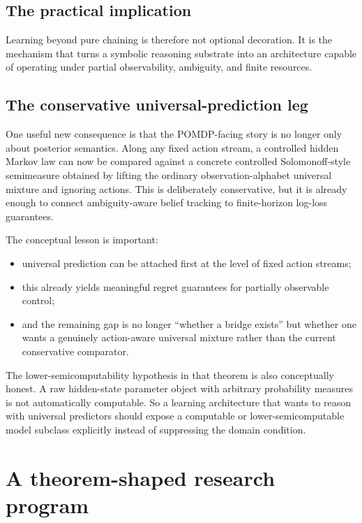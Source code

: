 \documentclass[11pt]{article}
\begin{document}
\subsection{The practical implication}

Learning beyond pure chaining is therefore not optional decoration.  It is the
mechanism that turns a symbolic reasoning substrate into an architecture capable
of operating under partial observability, ambiguity, and finite resources.

\subsection{The conservative universal-prediction leg}

One useful new consequence is that the POMDP-facing story is no longer only
about posterior semantics.  Along any fixed action stream, a controlled hidden
Markov law can now be compared against a concrete controlled Solomonoff-style
semimeasure obtained by lifting the ordinary observation-alphabet universal
mixture and ignoring actions.  This is deliberately conservative, but it is
already enough to connect ambiguity-aware belief tracking to finite-horizon
log-loss guarantees.

The conceptual lesson is important:
\begin{itemize}
  \item universal prediction can be attached first at the level of fixed action
        streams;
  \item this already yields meaningful regret guarantees for partially
        observable control;
  \item and the remaining gap is no longer ``whether a bridge exists'' but
        whether one wants a genuinely action-aware universal mixture rather
        than the current conservative comparator.
\end{itemize}

The lower-semicomputability hypothesis in that theorem is also conceptually
honest.  A raw hidden-state parameter object with arbitrary probability
measures is not automatically computable.  So a learning architecture that
wants to reason with universal predictors should expose a computable or
lower-semicomputable model subclass explicitly instead of suppressing the
domain condition.

\section{A theorem-shaped research program}
\end{document}
